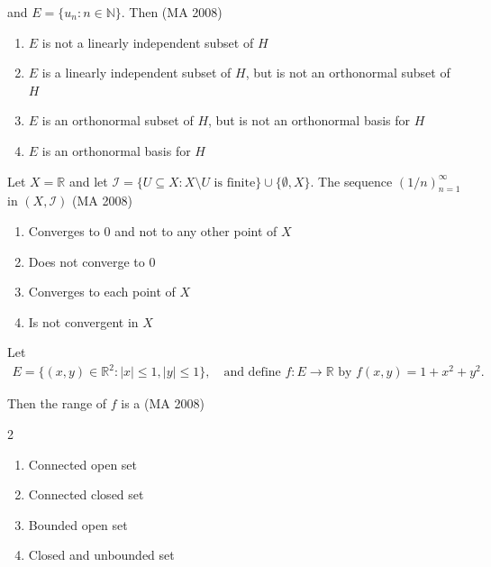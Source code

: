 and $E = \{u_n : n \in \mathbb{N}\}$. Then
\hfill (MA 2008)

\begin{enumerate}
    \item $E$ is not a linearly independent subset of $H$
    \item $E$ is a linearly independent subset of $H$, but is not an orthonormal subset of $H$
    \item $E$ is an orthonormal subset of $H$, but is not an orthonormal basis for $H$
    \item $E$ is an orthonormal basis for $H$
\end{enumerate}


\item
Let $X = \mathbb{R}$ and let $\mathcal{I} = \{ U \subseteq X : X \setminus U \text{ is finite}\} \cup \{\emptyset, X\}$. The sequence $(1/n)_{n=1}^\infty$ in $(X, \mathcal{I})$ 
\hfill (MA 2008)

\begin{enumerate}
    \item Converges to $0$ and not to any other point of $X$
    \item Does not converge to $0$
    \item Converges to each point of $X$
    \item Is not convergent in $X$
\end{enumerate}


\item
Let
\begin{align}
    E = \{(x,y) \in \mathbb{R}^2 : |x| \leq 1, |y| \leq 1 \}, \quad \text{and define } f : E \to \mathbb{R} \text{ by } f(x,y) = 1 + x^2 + y^2.
\end{align}

Then the range of $f$ is a
\hfill (MA 2008)
\begin{multicols}{2}
\begin{enumerate}
    \item Connected open set
    \item Connected closed set
    \item Bounded open set
    \item Closed and unbounded set
\end{enumerate}
\end{multicols}

